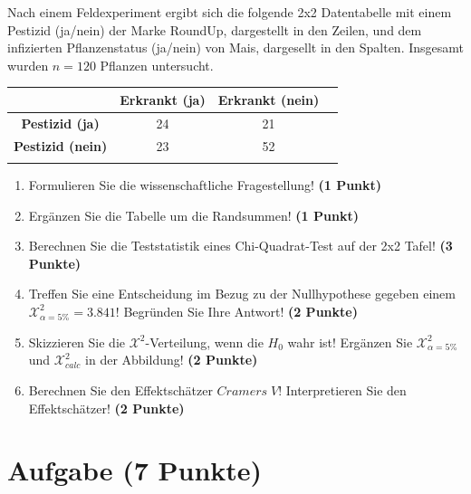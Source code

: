 \documentclass[a4paper, 10pt]{scrartcl}\usepackage[]{graphicx}\usepackage[]{xcolor}
\begin{document}
Nach einem Feldexperiment ergibt sich die folgende 2x2 Datentabelle mit einem
Pestizid (ja/nein) der Marke RoundUp, dargestellt in den Zeilen, und
dem infizierten Pflanzenstatus (ja/nein) von Mais, dargesellt in
den Spalten. Insgesamt wurden $n = 120$ Pflanzen untersucht.
\vspace{5Ex}

\begin{center}
  \Large
  \begin{tabular}{c|c|c|c}
     & \textbf{Erkrankt (ja)} & \textbf{Erkrankt (nein)} &  \strut\\
    \hline
    \textbf{Pestizid (ja)} & 24  & 21  &     \strut\\
    \hline
    \textbf{Pestizid (nein)} & 23  & 52  &      \strut\\
    \hline
     \phantom{100} & \phantom{100}  & \phantom{100}  &  \phantom{100}  \strut\\
  \end{tabular}
\end{center}

\vspace{5Ex}

\begin{enumerate}
\item Formulieren Sie die wissenschaftliche Fragestellung! \textbf{(1 Punkt)}
\item Erg{\"a}nzen Sie die Tabelle um die Randsummen! \textbf{(1 Punkt)} 
\item Berechnen Sie die Teststatistik eines Chi-Quadrat-Test auf der 2x2
  Tafel! \textbf{(3 Punkte)}
\item Treffen Sie eine Entscheidung im Bezug zu der Nullhypothese gegeben
  einem $\mathcal{X}^2_{\alpha = 5\%} = 3.841$! Begr{\"u}nden Sie Ihre Antwort!
  \textbf{(2 Punkte)}
\item Skizzieren Sie die $\mathcal{X}^2$-Verteilung, wenn die $H_0$ wahr
  ist! Erg{\"a}nzen Sie  $\mathcal{X}^2_{\alpha = 5\%}$ und
  $\mathcal{X}^2_{calc}$ in der Abbildung! \textbf{(2 Punkte)}
\item Berechnen Sie den Effektsch{\"a}tzer $Cramers\; V$! Interpretieren Sie den
  Effektsch{\"a}tzer! \textbf{(2 Punkte)}
\end{enumerate} 
\clearpage

\section{Aufgabe \hfill (7 Punkte)}
\end{document}
